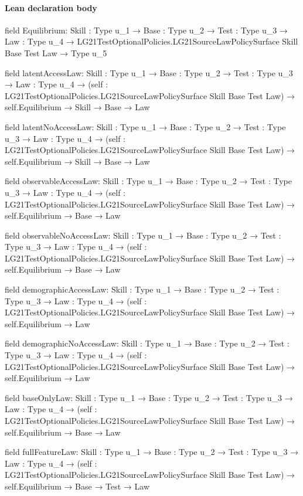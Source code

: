 \documentclass[10pt]{article}
\begin{document}
\paragraph{Lean declaration body}
\begin{ReviewVerbatim}
field Equilibrium:
{Skill : Type u_1} →
  {Base : Type u_2} →
    {Test : Type u_3} →
      {Law : Type u_4} → LG21TestOptionalPolicies.LG21SourceLawPolicySurface Skill Base Test Law → Type u_5

field latentAccessLaw:
{Skill : Type u_1} →
  {Base : Type u_2} →
    {Test : Type u_3} →
      {Law : Type u_4} →
        (self : LG21TestOptionalPolicies.LG21SourceLawPolicySurface Skill Base Test Law) →
          self.Equilibrium → Skill → Base → Law

field latentNoAccessLaw:
{Skill : Type u_1} →
  {Base : Type u_2} →
    {Test : Type u_3} →
      {Law : Type u_4} →
        (self : LG21TestOptionalPolicies.LG21SourceLawPolicySurface Skill Base Test Law) →
          self.Equilibrium → Skill → Base → Law

field observableAccessLaw:
{Skill : Type u_1} →
  {Base : Type u_2} →
    {Test : Type u_3} →
      {Law : Type u_4} →
        (self : LG21TestOptionalPolicies.LG21SourceLawPolicySurface Skill Base Test Law) → self.Equilibrium → Base → Law

field observableNoAccessLaw:
{Skill : Type u_1} →
  {Base : Type u_2} →
    {Test : Type u_3} →
      {Law : Type u_4} →
        (self : LG21TestOptionalPolicies.LG21SourceLawPolicySurface Skill Base Test Law) → self.Equilibrium → Base → Law

field demographicAccessLaw:
{Skill : Type u_1} →
  {Base : Type u_2} →
    {Test : Type u_3} →
      {Law : Type u_4} →
        (self : LG21TestOptionalPolicies.LG21SourceLawPolicySurface Skill Base Test Law) → self.Equilibrium → Law

field demographicNoAccessLaw:
{Skill : Type u_1} →
  {Base : Type u_2} →
    {Test : Type u_3} →
      {Law : Type u_4} →
        (self : LG21TestOptionalPolicies.LG21SourceLawPolicySurface Skill Base Test Law) → self.Equilibrium → Law

field baseOnlyLaw:
{Skill : Type u_1} →
  {Base : Type u_2} →
    {Test : Type u_3} →
      {Law : Type u_4} →
        (self : LG21TestOptionalPolicies.LG21SourceLawPolicySurface Skill Base Test Law) → self.Equilibrium → Base → Law

field fullFeatureLaw:
{Skill : Type u_1} →
  {Base : Type u_2} →
    {Test : Type u_3} →
      {Law : Type u_4} →
        (self : LG21TestOptionalPolicies.LG21SourceLawPolicySurface Skill Base Test Law) →
          self.Equilibrium → Base → Test → Law
\end{ReviewVerbatim}
\end{document}
